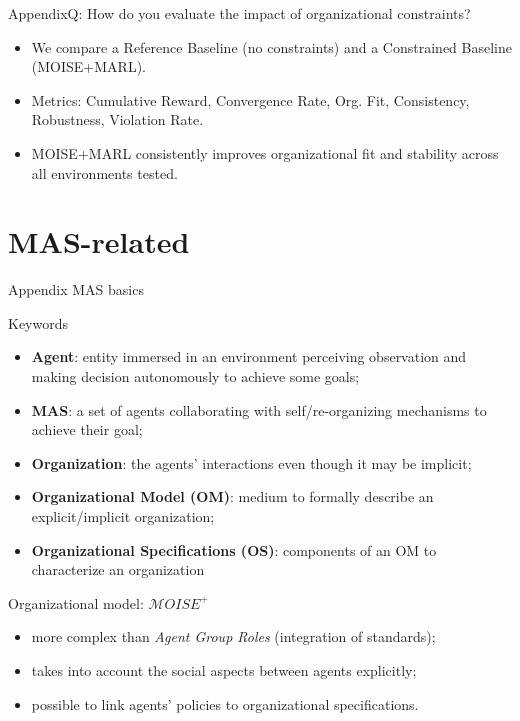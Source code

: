 \begin{frame}{Appendix}{Q: How do you evaluate the impact of organizational constraints?}
    \begin{itemize}
        \item We compare a Reference Baseline (no constraints) and a Constrained Baseline (MOISE+MARL).
        \item Metrics: Cumulative Reward, Convergence Rate, Org. Fit, Consistency, Robustness, Violation Rate.
        \item MOISE+MARL consistently improves organizational fit and stability across all environments tested.
    \end{itemize}
\end{frame}


\section{MAS-related}

\begin{frame}{Appendix}
    {MAS basics}

    \begin{block}{Keywords}
        \begin{itemize}
            \item \textbf{Agent}: entity immersed in an environment perceiving observation and making decision autonomously to achieve some goals;
            \item \textbf{MAS}: a set of agents collaborating with self/re-organizing mechanisms to achieve their goal;
            \item \textbf{Organization}: the agents' interactions even though it may be implicit;
            \item \textbf{Organizational Model (OM)}: medium to formally describe an explicit/implicit organization;
            \item \textbf{Organizational Specifications (OS)}: components of an OM to characterize an organization
        \end{itemize}
    \end{block}

    \begin{block}{Organizational model: $\mathcal{M}OISE^+$}
        \begin{itemize}
            \item more complex than \emph{Agent Group Roles} (integration of standards);
            \item takes into account the social aspects between agents explicitly;
            \item possible to link agents' policies to organizational specifications.
        \end{itemize}
    \end{block}

\end{frame}

